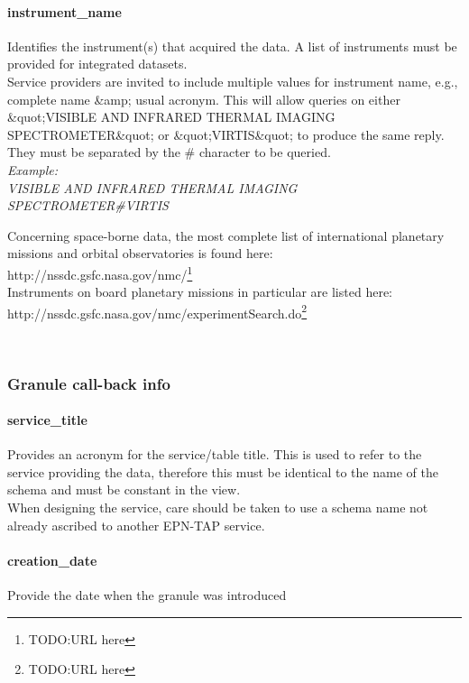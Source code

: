 \documentclass[11pt,a4paper]{ivoa}
\begin{document}
\paragraph{instrument\_name}

Identifies the instrument(s) that acquired the data. A list of instruments must be provided for integrated datasets. \\ Service providers are invited to include multiple values for instrument name, e.g., complete name \&amp; usual acronym. This will allow queries on either \&quot;VISIBLE AND INFRARED THERMAL IMAGING SPECTROMETER\&quot; or \&quot;VIRTIS\&quot; to produce the same reply. They must be separated by the \# character to be queried.\\\emph{\emph{Example:}}\\\emph{VISIBLE AND INFRARED THERMAL IMAGING SPECTROMETER\#VIRTIS}

Concerning space-borne data, the most complete list of international planetary missions and orbital observatories is found here:\\ http://nssdc.gsfc.nasa.gov/nmc/\footnote{TODO:URL here}\\ Instruments on board planetary missions in particular are listed here:\\ http://nssdc.gsfc.nasa.gov/nmc/experimentSearch.do\footnote{TODO:URL here}

 

\subsubsection{Granule call-back info}

\paragraph{service\_title}

Provides an acronym for the service/table title. This is used to refer to the service providing the data, therefore this must be identical to the name of the schema and must be constant in the view.\\When designing the service, care should be taken to use a schema name not already ascribed to another EPN-TAP service.

\paragraph{creation\_date}

Provide the date when the granule was introduced
\end{document}
